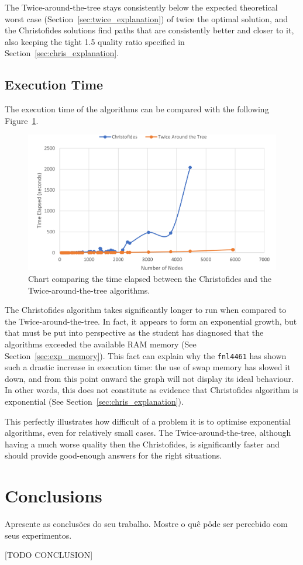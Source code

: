 \documentclass[12pt]{article}
\begin{document}
The Twice-around-the-tree stays consistently below the expected theoretical worst case (Section~\ref{sec:twice_explanation}) of 
twice the optimal solution, and the Christofides solutions find paths that are consistently better and closer to it, 
also keeping the tight 1.5 quality ratio specified in Section~\ref{sec:chris_explanation}.

\subsection{Execution Time} \label{sec:exp_time}

The execution time of the algorithms can be compared with the following Figure~\ref{fig:exec_time}.

\begin{figure}[ht]
\centering
\includegraphics[height=.325\textheight]{execution_time_comparison.png}
\caption{Chart comparing the time elapsed between the Christofides and the Twice-around-the-tree algorithms.}
\label{fig:exec_time}
\end{figure}

The Christofides algorithm takes significantly longer to run when compared to the Twice-around-the-tree. 
In fact, it appears to form an exponential growth, but that must be put into perspective as the student 
has diagnosed that the algorithms exceeded the available RAM memory (See Section~\ref{sec:exp_memory}). 
This fact can explain why the \texttt{fnl4461} has shown such a drastic increase in execution time: the use 
of swap memory has slowed it down, and from this point onward the graph will not display its ideal behaviour. In 
other words, this does not constitute as evidence that Christofides algorithm is exponential 
(See Section~\ref{sec:chris_explanation}).

This perfectly illustrates how difficult of a problem it is to optimise exponential algorithms, even for relatively 
small cases. The Twice-around-the-tree, although having a much worse quality then the Christofides, is 
significantly faster and should provide good-enough answers for the right situations.

\section{Conclusions} \label{sec:conclusions}
    Apresente as conclusões do seu trabalho. Mostre o quê pôde ser percebido
    com seus experimentos.

  [TODO CONCLUSION]



\end{document}
